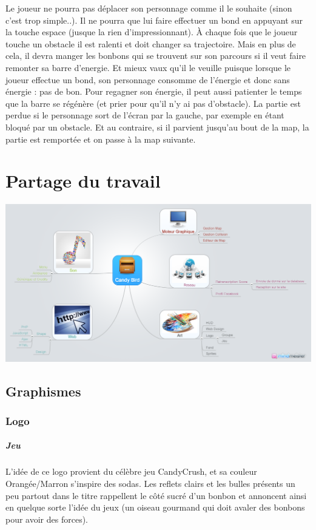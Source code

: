 \documentclass [11pt]{report}
\begin{document}
		\indent Le joueur ne pourra pas déplacer son personnage comme il le souhaite (sinon c'est trop simple..). Il ne pourra que lui faire effectuer un bond en appuyant sur la touche espace (jusque la rien d'impressionnant). \`A chaque fois que le joueur touche un obstacle il est ralenti et doit changer sa trajectoire. Mais en plus de cela, il 	devra manger les bonbons qui se trouvent sur son parcours si il veut faire remonter sa barre d'energie. Et mieux vaux qu'il le veuille puisque lorsque le joueur effectue un bond, son personnage consomme de l'énergie et donc sans énergie : pas de bon. Pour regagner son énergie, il peut aussi patienter le temps que la barre se régénère 		(et prier pour qu'il n'y ai pas d'obstacle). La partie est perdue si le personnage sort de l'écran par la gauche, par exemple en étant bloqué par un obstacle. Et au contraire, si il parvient jusqu'au bout de la map, la partie est remportée et on passe à la map suivante.

\newpage 


\chapter {Partage du travail}
\begin{center}
\includegraphics[scale=0.3]{images/Candy_Bird.png}
\end{center}

\newpage 

	


	\section{Graphismes}
		\subsection {Logo}
			\paragraph{Jeu}
				L'idée de ce logo provient du célèbre jeu CandyCrush, et sa couleur Orangée/Marron s'inspire des sodas. Les reflets clairs et les bulles présents un peu partout dans le titre rappellent le côté sucré d'un bonbon et annoncent ainsi en quelque sorte l'idée du jeux (un oiseau gourmand qui doit avaler des bonbons pour 				avoir des forces). 
\end{document}
